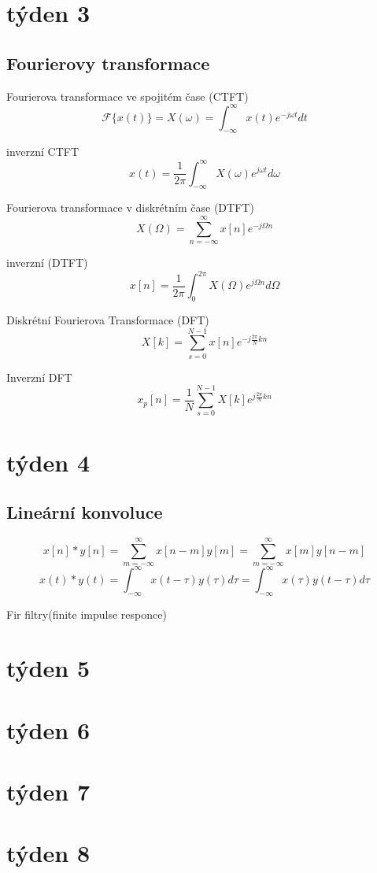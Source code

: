 \documentclass{article}
\begin{document}
\section*{týden 3}
	\subsection*{Fourierovy transformace}
		Fourierova transformace ve spojitém čase (CTFT)
			\[\mathcal{F}\{x(t)\} = X(\omega) 
			= \int_{-\infty}^{\infty} x(t)e^{-j\omega t} dt\]

		inverzní CTFT 
			\[x(t) = \frac{1}{2\pi} 
			\int_{-\infty}^{\infty} X(\omega)e^{j\omega t}d\omega\]

		Fourierova transformace v diskrétním čase (DTFT) 
		\[X(\Omega) = \sum_{n = - \infty}^{\infty} x[n]e^{-j\Omega n}\]

		inverzní (DTFT) 
		\[x[n] = \frac{1}{2 \pi} \int_{0}^{2 \pi} X(\Omega ) e^{j \Omega n} d\Omega\]


		Diskrétní Fourierova Transformace (DFT)
		\[X[k] = \sum_{s=0}^{N-1} x[n] e^{-j \frac{2\pi}{N}kn}\]

		Inverzní DFT
		\[x_p[n] = \frac{1}{N} \sum_{s=0}^{N-1} X[k] e^{j \frac{2\pi}{N}kn}\]


\section*{týden 4}
	\subsection*{Lineární konvoluce}
		\[x[n] \ast y[n] = \sum_{m=-\infty}^{\infty}x[n-m]y[m]
		= \sum_{m = -\infty}^{\infty}x[m]y[n-m]\]
		\[x(t) \ast y(t) = \int_{-\infty}^{\infty} x(t-\tau)y(\tau)d\tau
		= \int_{-\infty}^{\infty}x(\tau) y(t-\tau)d\tau\]

		Fir filtry(finite impulse responce)
		
	
\section*{týden 5}
\section*{týden 6}
\section*{týden 7}
\section*{týden 8}
\end{document}
